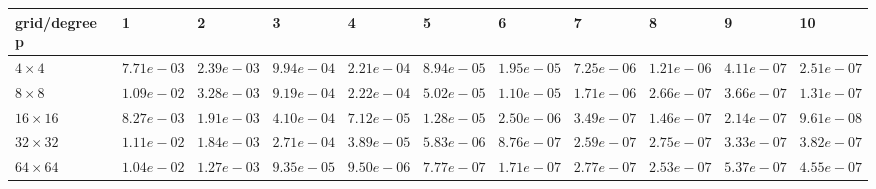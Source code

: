 \begin{tabular}{lllllllllll}
\hline
 grid/degree p   & 1          & 2          & 3          & 4          & 5          & 6          & 7          & 8          & 9          & 10         \\
\hline
 $4 \times 4$    & $7.71e-03$ & $2.39e-03$ & $9.94e-04$ & $2.21e-04$ & $8.94e-05$ & $1.95e-05$ & $7.25e-06$ & $1.21e-06$ & $4.11e-07$ & $2.51e-07$ \\
 $8 \times 8$    & $1.09e-02$ & $3.28e-03$ & $9.19e-04$ & $2.22e-04$ & $5.02e-05$ & $1.10e-05$ & $1.71e-06$ & $2.66e-07$ & $3.66e-07$ & $1.31e-07$ \\
 $16 \times 16$  & $8.27e-03$ & $1.91e-03$ & $4.10e-04$ & $7.12e-05$ & $1.28e-05$ & $2.50e-06$ & $3.49e-07$ & $1.46e-07$ & $2.14e-07$ & $9.61e-08$ \\
 $32 \times 32$  & $1.11e-02$ & $1.84e-03$ & $2.71e-04$ & $3.89e-05$ & $5.83e-06$ & $8.76e-07$ & $2.59e-07$ & $2.75e-07$ & $3.33e-07$ & $3.82e-07$ \\
 $64 \times 64$  & $1.04e-02$ & $1.27e-03$ & $9.35e-05$ & $9.50e-06$ & $7.77e-07$ & $1.71e-07$ & $2.77e-07$ & $2.53e-07$ & $5.37e-07$ & $4.55e-07$ \\
\hline
\end{tabular}